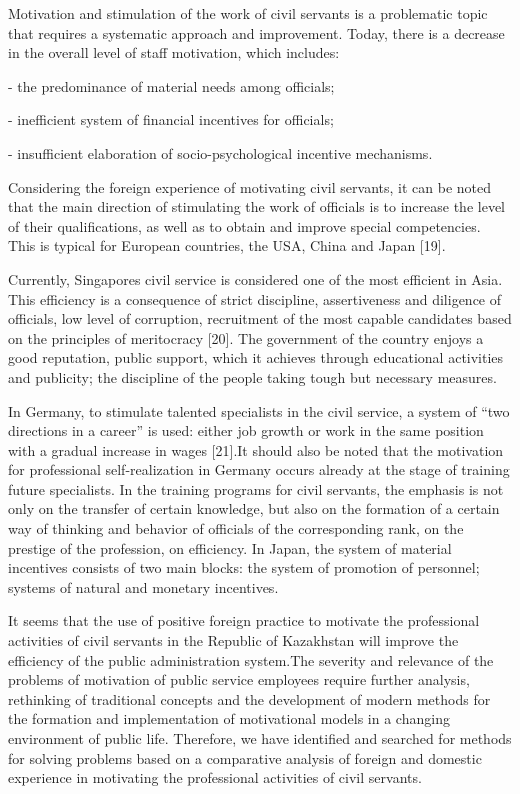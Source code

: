 \begin{multicols}{2}
Motivation and stimulation of the work of civil servants is a
problematic topic that requires a systematic approach and improvement.
Today, there is a decrease in the overall level of staff motivation,
which includes:

- the predominance of material needs among officials;

- inefficient system of financial incentives for officials;

- insufficient elaboration of socio-psychological incentive mechanisms.

Considering the foreign experience of motivating civil servants, it can
be noted that the main direction of stimulating the work of officials is
to increase the level of their qualifications, as well as to obtain and
improve special competencies. This is typical for European countries,
the USA, China and Japan {[}19{]}.

Currently, Singapore\textquotesingle s civil service is considered one
of the most efficient in Asia. This efficiency is a consequence of
strict discipline, assertiveness and diligence of officials, low level
of corruption, recruitment of the most capable candidates based on the
principles of meritocracy {[}20{]}. The government of the country enjoys
a good reputation, public support, which it achieves through educational
activities and publicity; the discipline of the people taking tough but
necessary measures.

In Germany, to stimulate talented specialists in the civil service, a
system of ``two directions in a career'' is used: either job growth or
work in the same position with a gradual increase in wages {[}21{]}.It
should also be noted that the motivation for professional
self-realization in Germany occurs already at the stage of training
future specialists. In the training programs for civil servants, the
emphasis is not only on the transfer of certain knowledge, but also on
the formation of a certain way of thinking and behavior of officials of
the corresponding rank, on the prestige of the profession, on
efficiency. In Japan, the system of material incentives consists of two
main blocks: the system of promotion of personnel; systems of natural
and monetary incentives.

It seems that the use of positive foreign practice to motivate the
professional activities of civil servants in the Republic of Kazakhstan
will improve the efficiency of the public administration system.The
severity and relevance of the problems of motivation of public service
employees require further analysis, rethinking of traditional concepts
and the development of modern methods for the formation and
implementation of motivational models in a changing environment of
public life. Therefore, we have identified and searched for methods for
solving problems based on a comparative analysis of foreign and domestic
experience in motivating the professional activities of civil servants.


\end{multicols}
